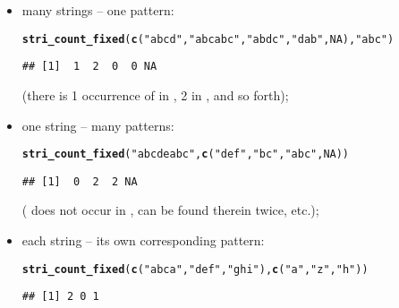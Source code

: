 \documentclass[nojss]{jss}\usepackage[]{graphicx}\usepackage[]{xcolor}
\makeatletter
\newcommand{\hlnum}[1]{\textcolor[rgb]{0.686,0.059,0.569}{#1}}%
\newcommand{\hlstr}[1]{\textcolor[rgb]{0.192,0.494,0.8}{#1}}%
\newcommand{\hlstd}[1]{\textcolor[rgb]{0.345,0.345,0.345}{#1}}%
\newcommand{\hlkwd}[1]{\textcolor[rgb]{0.737,0.353,0.396}{\textbf{#1}}}%
\newenvironment{kframe}{%
 \def\at@end@of@kframe{}%
 \ifinner\ifhmode%
  \def\at@end@of@kframe{\end{minipage}}%
  \begin{minipage}{\columnwidth}%
 \fi\fi%
 \def\FrameCommand##1{\hskip\@totalleftmargin \hskip-\fboxsep
 \colorbox{shadecolor}{##1}\hskip-\fboxsep
     \hskip-\linewidth \hskip-\@totalleftmargin \hskip\columnwidth}%
 \MakeFramed {\advance\hsize-\width
   \@totalleftmargin\z@ \linewidth\hsize
   \@setminipage}}%
 {\par\unskip\endMakeFramed%
 \at@end@of@kframe}
\newenvironment{knitrout}{}{} %
\makeatother
\begin{document}
\begin{itemize}
\item many strings -- one pattern:

\begin{knitrout}
\color{fgcolor}\begin{kframe}
\begin{alltt}
\hlkwd{stri_count_fixed}\hlstd{(}\hlkwd{c}\hlstd{(}\hlstr{"abcd"}\hlstd{,} \hlstr{"abcabc"}\hlstd{,} \hlstr{"abdc"}\hlstd{,} \hlstr{"dab"}\hlstd{,} \hlnum{NA}\hlstd{),} \hlstr{"abc"}\hlstd{)}
\end{alltt}
\begin{verbatim}
## [1]  1  2  0  0 NA
\end{verbatim}
\end{kframe}
\end{knitrout}

(there is 1 occurrence of  in ,
2 in , and so forth);

\item one string -- many patterns:

\begin{knitrout}
\color{fgcolor}\begin{kframe}
\begin{alltt}
\hlkwd{stri_count_fixed}\hlstd{(}\hlstr{"abcdeabc"}\hlstd{,} \hlkwd{c}\hlstd{(}\hlstr{"def"}\hlstd{,} \hlstr{"bc"}\hlstd{,} \hlstr{"abc"}\hlstd{,} \hlnum{NA}\hlstd{))}
\end{alltt}
\begin{verbatim}
## [1]  0  2  2 NA
\end{verbatim}
\end{kframe}
\end{knitrout}

( does not occur in ,
 can be found therein twice, etc.);

\item each string -- its own corresponding pattern:

\begin{knitrout}
\color{fgcolor}\begin{kframe}
\begin{alltt}
\hlkwd{stri_count_fixed}\hlstd{(}\hlkwd{c}\hlstd{(}\hlstr{"abca"}\hlstd{,} \hlstr{"def"}\hlstd{,} \hlstr{"ghi"}\hlstd{),} \hlkwd{c}\hlstd{(}\hlstr{"a"}\hlstd{,} \hlstr{"z"}\hlstd{,} \hlstr{"h"}\hlstd{))}
\end{alltt}
\begin{verbatim}
## [1] 2 0 1
\end{verbatim}
\end{kframe}
\end{knitrout}


\end{itemize}
\end{document}
